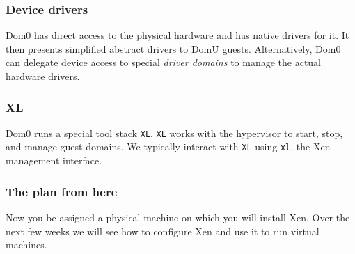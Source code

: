 \documentclass[10pt]{beamer}
\begin{document}
\begin{frame}
  \frametitle{Device drivers}
  
  Dom0 has direct access to the physical hardware and has native drivers for it. It then presents simplified abstract drivers to DomU guests. Alternatively, Dom0 can delegate device access to special \emph{driver domains} to manage the actual hardware drivers. 
  
  \vspace{5mm}
             
\end{frame}

\begin{frame}
  \frametitle{XL}
  
  Dom0 runs a special tool stack \texttt{XL}.  \texttt{XL} works with the hypervisor to start, stop, and manage guest domains. 
  We typically interact with \texttt{XL} using \texttt{xl}, the Xen management interface.         
  
  \end{frame}


\begin{frame}
  \frametitle{The plan from here}
  
  Now you be assigned a physical machine on which you will install Xen. Over the next few weeks we will see how to configure Xen and use it to run virtual machines. 
  
\end{frame}
\end{document}
